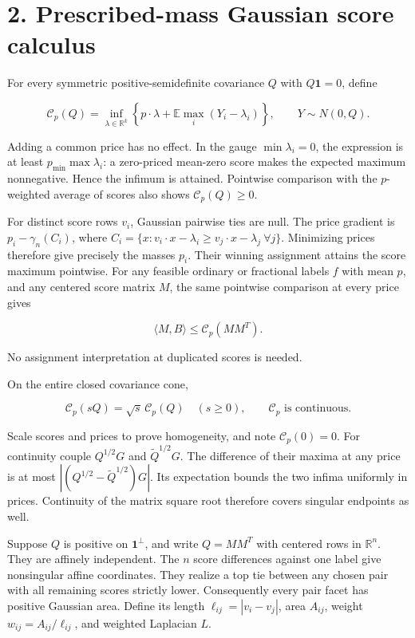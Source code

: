 \documentclass[
  11pt,
]{article}
\begin{document}
\section{2. Prescribed-mass Gaussian score
calculus}\label{prescribed-mass-gaussian-score-calculus}

For every symmetric positive-semidefinite covariance \(Q\) with
\(Q\mathbf1=0\), define

\[
 \mathcal C_p(Q)=\inf_{\lambda\in\mathbb R^k}
       \left\{p\cdot\lambda+\mathbb E\max_i(Y_i-\lambda_i)\right\},
                 \qquad Y\sim N(0,Q).                    \tag{6}
\]

Adding a common price has no effect. In the gauge \(\min\lambda_i=0\),
the expression is at least \(p_{\min}\max\lambda_i\): a zero-priced
mean-zero score makes the expected maximum nonnegative. Hence the
infimum is attained. Pointwise comparison with the \(p\)-weighted
average of scores also shows \(\mathcal C_p(Q)\ge0\).

For distinct score rows \(v_i\), Gaussian pairwise ties are null. The
price gradient is \(p_i-\gamma_n(C_i)\), where
\(C_i=\{x:v_i\cdot x-\lambda_i\ge v_j\cdot x-\lambda_j\ \forall j\}\).
Minimizing prices therefore give precisely the masses \(p_i\). Their
winning assignment attains the score maximum pointwise. For any feasible
ordinary or fractional labels \(f\) with mean \(p\), and any centered
score matrix \(M\), the same pointwise comparison at every price gives

\[
               \langle M,B\rangle\le\mathcal C_p(MM^T).  \tag{7}
\]

No assignment interpretation at duplicated scores is needed.

On the entire closed covariance cone,

\[
 \mathcal C_p(sQ)=\sqrt{s}\,\mathcal C_p(Q)\quad(s\ge0),
                  \qquad\mathcal C_p\text{ is continuous}.       \tag{8}
\]

Scale scores and prices to prove homogeneity, and note
\(\mathcal C_p(0)=0\). For continuity couple \(Q^{1/2}G\) and
\(\widetilde Q^{1/2}G\). The difference of their maxima at any price is
at most \(|(Q^{1/2}-\widetilde Q^{1/2})G|\). Its expectation bounds the
two infima uniformly in prices. Continuity of the matrix square root
therefore covers singular endpoints as well.

Suppose \(Q\) is positive on \(\mathbf1^\perp\), and write \(Q=MM^T\)
with centered rows in \(\mathbb R^n\). They are affinely independent.
The \(n\) score differences against one label give nonsingular affine
coordinates. They realize a top tie between any chosen pair with all
remaining scores strictly lower. Consequently every pair facet has
positive Gaussian area. Define its length \(\ell_{ij}=|v_i-v_j|\), area
\(A_{ij}\), weight \(w_{ij}=A_{ij}/\ell_{ij}\), and weighted Laplacian
\(L\).
\end{document}
